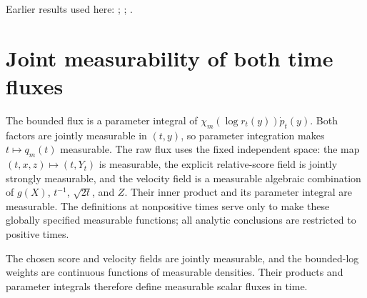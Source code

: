 \documentclass[11pt,a4paper]{article}
\begin{document}
Earlier results used here: \cite[Section~3.26.3]{LangevinLean2026ULASC}; \cite[Section~3.34.1]{LangevinLean2026ULASC}; \cite[Section~3.36.5]{LangevinLean2026ULASC}.

\section{\texorpdfstring{Joint measurability of both time fluxes}{Joint measurability of both time fluxes}}


The bounded flux is a parameter integral of \(\chi_m(\log r_t(y))\dot p_t(y)\). Both factors are jointly measurable in \((t,y)\), so parameter integration makes \(t\mapsto q_m(t)\) measurable. The raw flux uses the fixed independent space: the map \((t,x,z)\mapsto(t,Y_t)\) is measurable, the explicit relative-score field is jointly strongly measurable, and the velocity field is a measurable algebraic combination of \(g(X)\), \(t^{-1}\), \(\sqrt{2t}\), and \(Z\). Their inner product and its parameter integral are measurable. The definitions at nonpositive times serve only to make these globally specified measurable functions; all analytic conclusions are restricted to positive times.



The chosen score and velocity fields are jointly measurable, and the bounded-log weights are continuous functions of measurable densities. Their products and parameter integrals therefore define measurable scalar fluxes in time.
\end{document}
